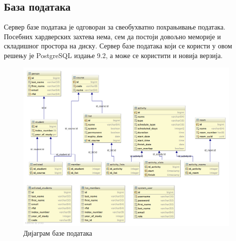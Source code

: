 \documentclass[a4paper, 12pt, diplomski]{etfcyr}
\begin{document}
			\subsection{База података}
				\begin{justify}
					Сервер базе података је одговоран за свеобухватно похрањивање података. Посебних хардверских захтева нема, сем да постоји довољно меморије и складишног простора на диску. Сервер базе података који се користи у овом решењу је PostgreSQL издање 9.2, а може се користити и новија верзија.
					\begin{figure}[h]
						\begin{center}
							\includegraphics[scale=0.35]{DatabaseDiagram.png}
						\end{center}
						\caption{Дијаграм базе података}
						\label{figure:2}
					\end{figure}
				\end{justify}
				
\end{document}
